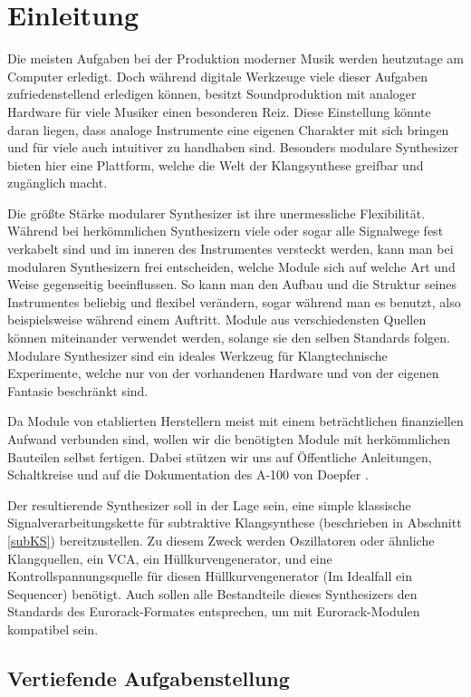 \chapter{Einleitung}

Die meisten Aufgaben bei der Produktion moderner Musik werden heutzutage am Computer erledigt. Doch während digitale Werkzeuge viele dieser Aufgaben zufriedenstellend erledigen können, besitzt Soundproduktion mit analoger Hardware für viele Musiker einen besonderen Reiz. Diese Einstellung könnte daran liegen, dass analoge Instrumente eine eigenen Charakter mit sich bringen und für viele auch intuitiver zu handhaben sind. Besonders modulare Synthesizer bieten hier eine Plattform, welche die Welt der Klangsynthese greifbar und zugänglich macht.

Die größte Stärke modularer Synthesizer ist ihre unermessliche Flexibilität. Während bei herkömmlichen Synthesizern viele oder sogar alle Signalwege fest verkabelt sind und im inneren des Instrumentes versteckt werden, kann man bei modularen Synthesizern frei entscheiden, welche Module sich auf welche Art und Weise gegenseitig beeinflussen. So kann man den Aufbau und die Struktur seines Instrumentes beliebig und flexibel verändern, sogar während man es benutzt, also beispielsweise während einem Auftritt. Module aus verschiedensten Quellen können miteinander verwendet werden, solange sie den selben Standards folgen. Modulare Synthesizer sind ein ideales Werkzeug für Klangtechnische Experimente, welche nur von der vorhandenen Hardware und von der eigenen Fantasie beschränkt sind.

Da Module von etablierten Herstellern meist mit einem beträchtlichen finanziellen Aufwand verbunden sind, wollen wir die benötigten Module mit herkömmlichen Bauteilen selbst fertigen. Dabei stützen wir uns auf Öffentliche Anleitungen, Schaltkreise und auf die Dokumentation des A-100 von Doepfer \cite{doepfer:A-100}.

Der resultierende Synthesizer soll in der Lage sein, eine simple klassische Signalverarbeitungskette für subtraktive Klangsynthese (beschrieben in Abschnitt \ref{subKS}) bereitzustellen. Zu diesem Zweck werden Oszillatoren oder ähnliche Klangquellen, ein \ac{VCA}, ein Hüllkurvengenerator, und eine Kontrollspannungsquelle für diesen Hüllkurvengenerator (Im Idealfall ein Sequencer) benötigt. Auch sollen alle Bestandteile dieses Synthesizers den Standards des Eurorack-Formates entsprechen, um mit Eurorack-Modulen kompatibel sein.

\section{Vertiefende Aufgabenstellung}


